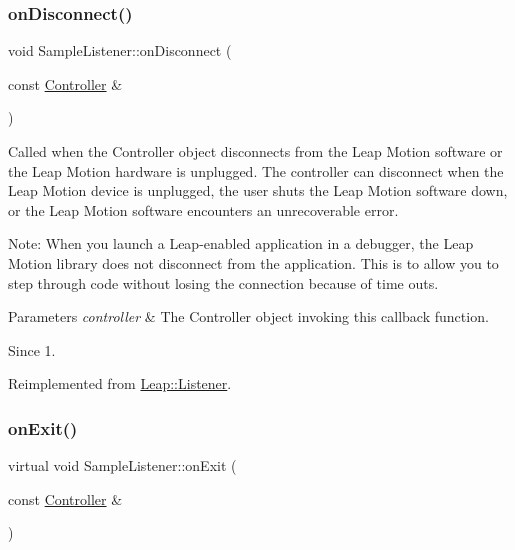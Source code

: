 \subsubsection{\texorpdfstring{on\+Disconnect()}{onDisconnect()}\hspace{0.1cm}{\footnotesize\ttfamily [2/2]}}
{\footnotesize\ttfamily void Sample\+Listener\+::on\+Disconnect (\begin{DoxyParamCaption}\item[{const \hyperlink{class_leap_1_1_controller}{Controller} \&}]{ }\end{DoxyParamCaption})\hspace{0.3cm}{\ttfamily [virtual]}}

Called when the Controller object disconnects from the Leap Motion software or the Leap Motion hardware is unplugged. The controller can disconnect when the Leap Motion device is unplugged, the user shuts the Leap Motion software down, or the Leap Motion software encounters an unrecoverable error.


\begin{DoxyCodeInclude}
\end{DoxyCodeInclude}


Note\+: When you launch a Leap-\/enabled application in a debugger, the Leap Motion library does not disconnect from the application. This is to allow you to step through code without losing the connection because of time outs.


\begin{DoxyParams}{Parameters}
{\em controller} & The Controller object invoking this callback function. \\
\hline
\end{DoxyParams}
\begin{DoxySince}{Since}
1. 
\end{DoxySince}


Reimplemented from \hyperlink{class_leap_1_1_listener_ac031e2d95b530097e2060518a9190f5e}{Leap\+::\+Listener}.

\mbox{\label{class_sample_listener_affb615dc62b6936718c40497e819adb7}} 
\subsubsection{\texorpdfstring{on\+Exit()}{onExit()}\hspace{0.1cm}{\footnotesize\ttfamily [1/2]}}
{\footnotesize\ttfamily virtual void Sample\+Listener\+::on\+Exit (\begin{DoxyParamCaption}\item[{const \hyperlink{class_leap_1_1_controller}{Controller} \&}]{ }\end{DoxyParamCaption})\hspace{0.3cm}{\ttfamily [virtual]}}

